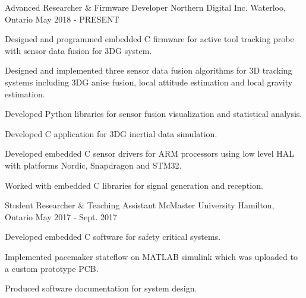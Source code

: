 
\begin{cventries}

  \cventry
    {Advanced Researcher \& Firmware Developer} %
    {Northern Digital Inc.} %
    {Waterloo, Ontario} %
    {May 2018 - PRESENT} %
    {
      \begin{cvitems} %
        \item {Designed and programmed embedded C firmware for active tool tracking probe with sensor data fusion for 3DG system.}
        \item {Designed and implemented three sensor data fusion algorithms for 3D tracking systems including 3DG anise fusion, local attitude estimation and local gravity estimation.}
        \item {Developed Python libraries for sensor fusion visualization and statistical analysis.}
        \item {Developed C application for 3DG inertial data simulation.}
        \item {Developed embedded C sensor drivers for ARM processors using low level HAL with platforms Nordic, Snapdragon and STM32.}
        \item {Worked with embedded C libraries for signal generation and reception.}
      \end{cvitems}
    }

  \cventry
    {Student Researcher \& Teaching Assistant} %
    {McMaster University} %
    {Hamilton, Ontario} %
    {May 2017 - Sept. 2017} %
    {
      \begin{cvitems} %
        \item {Developed embedded C software for safety critical systems.}
        \item {Implemented pacemaker stateflow on MATLAB simulink which was uploaded to a custom prototype PCB.}
        \item {Produced software documentation for system design.}
      \end{cvitems}
    }


\end{cventries}
